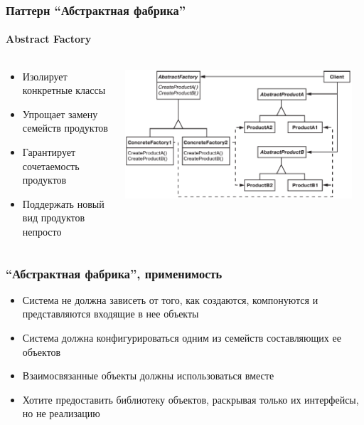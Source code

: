\documentclass[xetex,mathserif,serif]{beamer}
\begin{document}
	\begin{frame}
		\frametitle{Паттерн ``Абстрактная фабрика''}
		\framesubtitle{Abstract Factory}
		\begin{columns}
			\begin{column}{0.4\textwidth}
				\begin{itemize}
					\item Изолирует конкретные классы
					\item Упрощает замену семейств продуктов
					\item Гарантирует сочетаемость продуктов
					\item Поддержать новый вид продуктов непросто
				\end{itemize}
			\end{column}
			\begin{column}{0.6\textwidth}
				\begin{center}
					\includegraphics[width=0.95\textwidth]{abstractFactory.png}
				\end{center}
			\end{column}
		\end{columns}
	\end{frame}

	\begin{frame}
		\frametitle{``Абстрактная фабрика'', применимость}
		\begin{itemize}
			\item Система не должна зависеть от того, как создаются, компонуются и представляются входящие в нее объекты
			\item Система должна конфигурироваться одним из семейств составляющих ее объектов
			\item Взаимосвязанные объекты должны использоваться вместе
			\item Хотите предоставить библиотеку объектов, раскрывая только их интерфейсы, но не реализацию
		\end{itemize}
	\end{frame}
\end{document}
